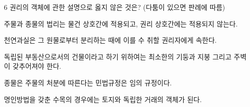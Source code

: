 \begin{question}{6}
권리의 객체에 관한 설명으로 옳지 않은 것은? (다툼이 있으면 판례에 따름)
\begin{choices}
  \item 주물과 종물의 법리는 물건 상호간에 적용되고, 권리 상호간에는 적용되지 않는다.
  \item 천연과실은 그 원물로부터 분리하는 때에 이를 수 취할 권리자에게 속한다.
  \item 독립된 부동산으로서의 건물이라고 하기 위하여는 최소한의 기둥과 지붕 그리고 주벽이 갖추어져야 한다.
  \item 종물은 주물의 처분에 따른다는 민법규정은 임의 규정이다.
  \item 명인방법을 갖춘 수목의 경우에는 토지와 독립한 거래의 객체가 된다.
\end{choices}
\end{question}

